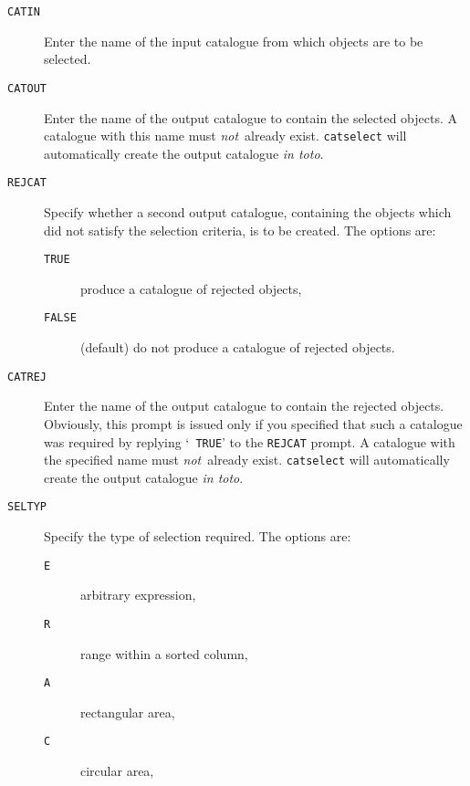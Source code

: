 \documentclass[twoside,11pt]{article}
\renewcommand{\_}{\texttt{\symbol{95}}}
\begin{document}
\begin{description}

  \item[ {\tt CATIN} ] Enter the name of the input catalogue from which
   objects are to be selected.

  \item[ {\tt CATOUT} ] Enter the name of the output catalogue to
   contain the selected objects.  A catalogue with this name must {\it
   not}\, already exist.  {\tt catselect} will automatically create the
   output catalogue {\it in toto}.

  \item[ {\tt REJCAT} ] Specify whether a second output catalogue,
   containing the objects which did not satisfy the selection criteria,
   is to be created.  The options are:

  \begin{description}

    \item[ {\tt TRUE} ] produce a catalogue of rejected objects,

    \item[ {\tt FALSE} ] (default) do not produce a catalogue of rejected
     objects.

  \end{description}

  \item[ {\tt CATREJ} ] Enter the name of the output catalogue to
   contain the rejected objects.  Obviously, this prompt is issued only
   if you specified that such a catalogue was required by replying `{\tt
   TRUE}' to the {\tt REJCAT} prompt.  A catalogue with the specified name
   must {\it not}\, already exist.  {\tt catselect} will automatically
   create the output catalogue {\it in toto}.

  \item[ {\tt SELTYP} ] Specify the type of selection required.  The
   options are:

  \begin{description}

    \item[ {\tt E} ] arbitrary expression,

    \item[ {\tt R} ] range within a sorted column,

    \item[ {\tt A} ] rectangular area,

    \item[ {\tt C} ] circular area,


\end{description}
\end{description}
\end{document}
